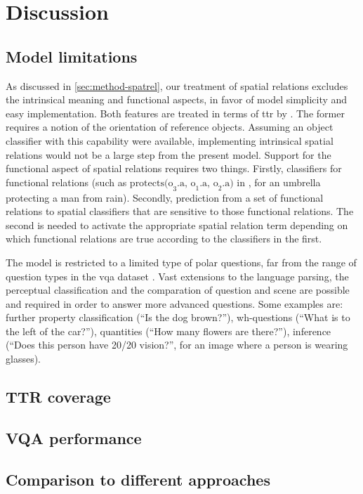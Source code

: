 \section{Discussion}
\label{sec:discussion}



\subsection{Model limitations}

As discussed in \autoref{sec:method-spatrel}, our treatment of spatial relations excludes the intrinsical meaning and functional aspects, in favor of model simplicity and easy implementation.
Both features are treated in terms of \gls{ttr} by \cite{ttrspat}.
The former requires a notion of the orientation of reference objects.
Assuming an object classifier with this capability were available, implementing intrinsical spatial relations would not be a large step from the present model.
Support for the functional aspect of spatial relations requires two things.
Firstly, classifiers for functional relations (such as $\text{protects(o}_3\text{.a, o}_1\text{.a, o}_2\text{.a)}$ in \cite{ttrspat}, for an umbrella protecting a man from rain).
Secondly, prediction from a set of functional relations to spatial classifiers that are sensitive to those functional relations.
The second is needed to activate the appropriate spatial relation term depending on which functional relations are true according to the classifiers in the first.

The model is restricted to a limited type of polar questions, far from the range of question types in the \gls{vqa} dataset \citep{AgrawalVQAVisualQuestion2015}.
Vast extensions to the language parsing, the perceptual classification and the comparation of question and scene are possible and required in order to answer more advanced questions.
Some examples are:
further property classification (``Is the dog brown?''),
wh-questions (``What is to the left of the car?''),
quantities (``How many flowers are there?''),
inference (``Does this person have 20/20 vision?'', for an image where a person is wearing glasses).



\subsection{TTR coverage}



\subsection{VQA performance}



\subsection{Comparison to different approaches}



